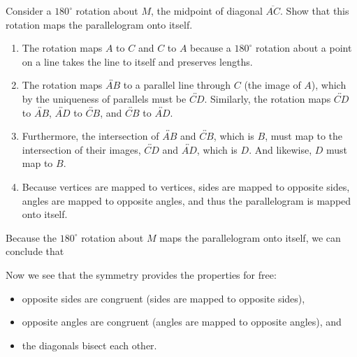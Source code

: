 \documentclass[nooutcomes]{ximera}
\begin{document}
\begin{problem}
Consider a $180^\circ$ rotation about $M$, the midpoint of diagonal $\overline{AC}$.  Show that this rotation maps the parallelogram onto itself.  
\begin{enumerate}
\item The rotation maps $A$ to $C$ and $C$ to $A$ because a $180^\circ$ rotation about a point on a line takes the line to itself and preserves lengths.
\item The rotation maps $\overleftrightarrow{AB}$ to a parallel line through $C$ (the image of $A$), which by the uniqueness of parallels must 
be $\overleftrightarrow{CD}$.  Similarly, the rotation maps 
$\overleftrightarrow{CD}$ to $\overleftrightarrow{AB}$, 
$\overleftrightarrow{AD}$ to $\overleftrightarrow{CB}$, and
$\overleftrightarrow{CB}$ to $\overleftrightarrow{AD}$.
\item Furthermore, the intersection of $\overleftrightarrow{AB}$ and $\overleftrightarrow{CB}$, which is $B$, must map to the intersection of their images, $\overleftrightarrow{CD}$ and $\overleftrightarrow{AD}$, which is $D$.  And likewise, $D$ must map to $B$.
\item Because vertices are mapped to vertices, sides are mapped to opposite sides, angles are mapped to opposite angles, and thus the parallelogram is mapped onto itself.  
\end{enumerate}

Because the $180^\circ$ rotation about $M$ maps the parallelogram onto itself, we can conclude that

Now we see that the symmetry provides the properties for free:  

\begin{itemize}
\item opposite sides are congruent (sides are mapped to opposite sides), 
\item opposite angles are congruent (angles are mapped to opposite angles), and 
\item the diagonals bisect each other.

\end{itemize}

\end{problem}
\end{document}
